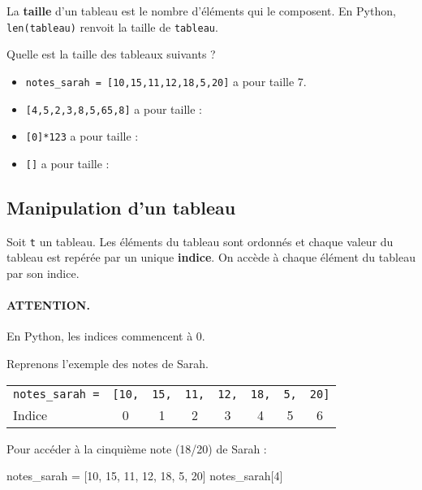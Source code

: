 \documentclass[12pt]{article}                   %
\theoremstyle{exercicestyle}
\theoremstyle{break2}
\theoremstyle{break3}
\begin{document}
\begin{definition}
    La \textbf{taille} d'un tableau est le nombre d'éléments qui le composent. En Python, \texttt{len(tableau)} renvoit la taille de \texttt{tableau}.
\end{definition} 

\begin{exemple}
   Quelle est la taille des tableaux suivants ?
   \begin{itemize}[label=\textbullet]
       \item \texttt{notes\_sarah = [10,15,11,12,18,5,20]} a pour taille 7.
       \item \texttt{[4,5,2,3,8,5,65,8]} a pour taille : \dotfill
       \item \texttt{[0]*123} a pour taille : \dotfill
       \item  \texttt{[]} a pour taille : \dotfill
   \end{itemize}
\end{exemple}


\subsection{Manipulation d'un tableau}

\begin{definition}
    Soit \texttt{t} un tableau. Les éléments du tableau sont ordonnés et chaque valeur du tableau est repérée par un unique \textbf{indice}. On accède à chaque élément du tableau par son indice.
\end{definition} 

\paragraph{ATTENTION.} En Python, les indices commencent à 0.

\begin{exemple}
    Reprenons l'exemple des notes de Sarah.

\begin{center}
\begin{tabular}{M{3cm}ccccccc}
    \texttt{notes\_sarah =} & \texttt{[10,} & \texttt{15,} & \texttt{11,} & \texttt{12,} & \texttt{18,} & \texttt{5,} & \texttt{20]} \\
    Indice & 0 & 1 & 2 & 3 & 4 & 5 & 6 \\
\end{tabular}
\end{center}

Pour accéder à la cinquième note (18/20) de Sarah :

\begin{pyconsole}[][frame=single, framesep=2mm, label=Console Python,linenos=true]
notes_sarah = [10, 15, 11, 12, 18, 5, 20]
notes_sarah[4]
\end{pyconsole}
\end{exemple}
\end{document}
